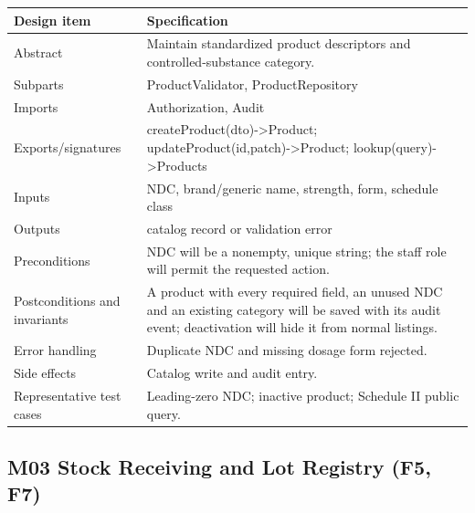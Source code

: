 {\def\LTcaptype{none} %
\begin{longtable}[]{|
  >{\raggedright\arraybackslash}m{}|
  >{\raggedright\arraybackslash}m{}|}
\hline
\begin{minipage}[c]{\linewidth}\raggedright
\textbf{Design item}
\end{minipage} & \begin{minipage}[c]{\linewidth}\raggedright
\textbf{Specification}
\end{minipage} \\
\hline
\endhead

\endlastfoot
Abstract & Maintain standardized product descriptors and controlled-substance category. \\ \hline
Subparts & ProductValidator, ProductRepository \\ \hline
Imports & Authorization, Audit \\ \hline
Exports/signatures & createProduct(dto)-\textgreater Product; updateProduct(id,patch)-\textgreater Product; lookup(query)-\textgreater Products \\ \hline
Inputs & NDC, brand/generic name, strength, form, schedule class \\ \hline
Outputs & catalog record or validation error \\ \hline
Preconditions & NDC will be a nonempty, unique string; the staff role will permit the requested action. \\ \hline
Postconditions and invariants & A product with every required field, an unused NDC and an existing category will be saved with its audit event; deactivation will hide it from normal listings. \\ \hline
Error handling & Duplicate NDC and missing dosage form rejected. \\ \hline
Side effects & Catalog write and audit entry. \\ \hline
Representative test cases & Leading-zero NDC; inactive product; Schedule II public query. \\ \hline
\end{longtable}
}

\subsection{M03 Stock Receiving and Lot Registry (F5, F7)}\label{m03-stock-receiving-and-lot-registry-f5-f7}

